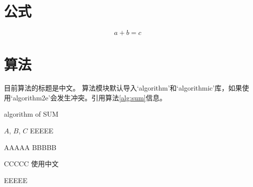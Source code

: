 \section{公式}

\begin{equation}
  a + b = c
\end{equation}


\section{算法}

目前算法的标题是中文。%
算法模块默认导入`algorithm'和`algorithmic'库，如果使用`algorithm2e'会发生冲突。引用算法\ref{alg:sum}信息。

\begin{algorithm}[htbp]
    \caption{algorithm of SUM}
    \label{alg:sum}
    \renewcommand{\algorithmicrequire}{\textbf{Input:}}
    \renewcommand{\algorithmicensure}{\textbf{Output:}}
    \begin{algorithmic}[1]
        \REQUIRE $A$, $B$, $C$  %
        \ENSURE EEEEE    %
        
        \STATE  AAAAA
            \STATE BBBBB
        \ENDWHILE
        
                \STATE CCCCC
            \ELSE
                \STATE 使用中文
            \ENDIF
        \ENDFOR
        
        \RETURN EEEEE
    \end{algorithmic}
\end{algorithm}